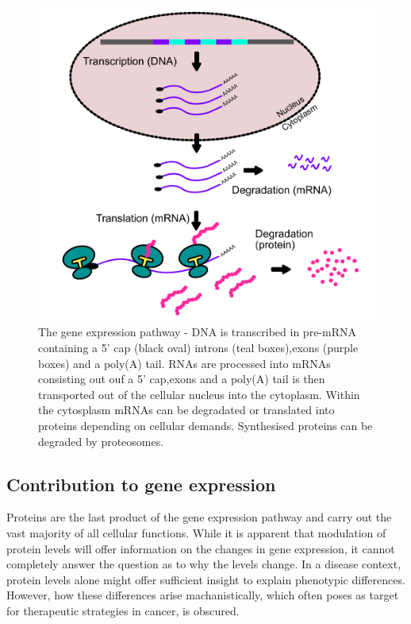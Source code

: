 \documentclass[12pt,openany]{book}
\begin{document}
\clearpage

\begin{figure}
  \includegraphics{./figures/geneExprPath_2.pdf}
  \caption{The gene expression pathway - DNA is transcribed in pre-mRNA containing a 5' cap (black oval) introns (teal boxes),exons (purple boxes) and a poly(A) tail. RNAs are processed into mRNAs consisting out ouf a 5' cap,exons and a poly(A) tail is then transported out of the cellular nucleus into the cytoplasm. Within the cytosplasm mRNAs can be degradated or translated  into proteins depending on cellular demands. Synthesised proteins can be degraded by proteosomes. \label{fig:geneExprPath}}
\end{figure}

\clearpage
\subsection{Contribution to gene expression} Proteins are the last
product of the gene expression pathway and carry out the vast majority
of all cellular functions. While it is apparent that modulation of
protein levels will offer information on the changes in gene expression,
it cannot completely answer the question as to why the levels change. In
a disease context, protein levels alone might offer sufficient insight
to explain phenotypic differences. However, how these differences arise
machanistically, which often poses as target for therapeutic strategies
in cancer, is obscured.
\end{document}
